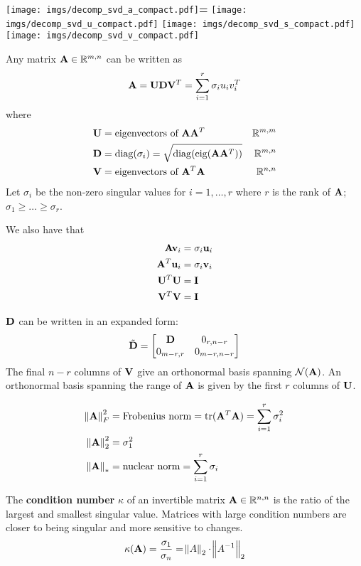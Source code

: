 \begin{center}
\texttt{[image: imgs/decomp\_svd\_a\_compact.pdf]}\textbf{\large =}
\texttt{[image: imgs/decomp\_svd\_u\_compact.pdf]}\textbf{\large *}
\texttt{[image: imgs/decomp\_svd\_s\_compact.pdf]}\textbf{\large *}
\texttt{[image: imgs/decomp\_svd\_v\_compact.pdf]}
\end{center}

Any matrix $\mathbf{A}\in\mathbb{R}^{m,n}$ can be written as
\begin{equation}
\mathbf{A}=\mathbf{U} \mathbf{D} \mathbf{V}^T=\sum_{i=1}^r \sigma_i u_i v_i^T
\end{equation}
where
\begin{align}
\mathbf{U}&=\textrm{eigenvectors of~}\mathbf{A}\mathbf{A}^T & \mathbb{R}^{m,m} \\
\mathbf{D}&=\operatorname{diag}(\sigma_i)=\sqrt{\operatorname{diag}(\operatorname{eig}(\mathbf{A}\mathbf{A}^T))}      & \mathbb{R}^{m,n} \\
\mathbf{V}&=\textrm{eigenvectors of~}\mathbf{A}^T\mathbf{A} & \mathbb{R}^{n,n}
\end{align}
Let $\sigma_i$ be the non-zero singular values for $i=1,\ldots,r$ where $r$ is the rank of $\mathbf{A}$; $\sigma_1\ge\ldots\ge\sigma_r$.

We also have that
\begin{align}
\mathbf{A}   \mathbf{v}_i &= \sigma_i \mathbf{u}_i \\
\mathbf{A}^T \mathbf{u}_i &= \sigma_i \mathbf{v}_i \\
\mathbf{U}^T\mathbf{U} &= \mathbf{I} \\
\mathbf{V}^T\mathbf{V} &= \mathbf{I}
\end{align}

$\mathbf{D}$ can be written in an expanded form:
\begin{equation}
\tilde {\mathbf{D}}=
\begin{bmatrix}
\mathbf{D}       & 0_{r,n-r}   \\
0_{m-r,r} & 0_{m-r,n-r}
\end{bmatrix}
\end{equation}
The final $n-r$ columns of $\mathbf{V}$ give an orthonormal basis spanning $\mathcal{N}(\mathbf{A})$. An orthonormal basis spanning the range of $\mathbf{A}$ is given by the first $r$ columns of $\mathbf{U}$.

\begin{align}
\norm{\mathbf{A}}^2_F&=\textrm{Frobenius norm} =\operatorname{tr}(\mathbf{A}^T\mathbf{A})=\sum_{i=1}^r \sigma_i^2 \\
\norm{\mathbf{A}}^2_2&=\sigma_1^2 \\
\norm{\mathbf{A}}_* &= \textrm{nuclear norm}=\sum_{i=1}^r \sigma_i
\end{align}

The \textbf{condition number} $\kappa$ of an invertible matrix $\mathbf{A}\in\mathbb{R}^{n,n}$ is the ratio of the largest and smallest singular value. Matrices with large condition numbers are closer to being singular and more sensitive to changes.
\begin{equation}
\kappa(\mathbf{A})=\frac{\sigma_1}{\sigma_n}=\norm{A}_2 \cdot \norm{A^{-1}}_2
\end{equation}

